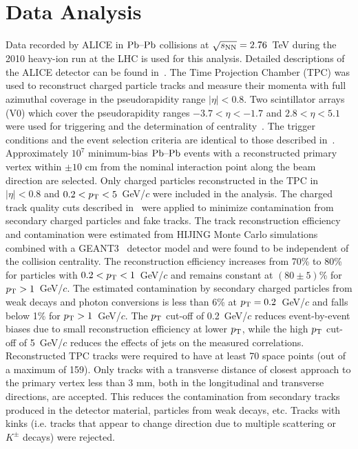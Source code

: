 \section{Data Analysis}
\label{sec:experiment}
Data recorded by ALICE in $\textnormal{Pb--Pb}$ collisions at $\sqrt{s_{\textnormal{NN}}}=2.76$~TeV during the 2010 heavy-ion run at the
LHC is used for this analysis. Detailed descriptions of the ALICE
detector can be found
in~\cite{Aamodt:2008zz,Carminati:2004fp,Alessandro:2006yt}. The Time
Projection Chamber (TPC) was used to reconstruct charged particle
tracks and measure their momenta with full azimuthal coverage in the
pseudorapidity range $|\eta|<0.8$. Two scintillator
arrays (V0) which cover the pseudorapidity  ranges $-3.7<\eta<-1.7$
and $2.8<\eta<5.1$ were used for triggering and the determination of
centrality~\cite{Aamodt:2010cz}. The trigger
conditions and the event selection criteria are identical to those
described in~\cite{Aamodt:2010pa, Aamodt:2010cz}.
Approximately $10^7$ minimum-bias $\textnormal{Pb--Pb}$ events with
a reconstructed primary vertex within $\pm 10$ cm from the nominal
interaction point along the beam direction are selected. Only charged particles reconstructed in the TPC in $|\eta|<0.8$
and $0.2<p_{\rm T}<5$~GeV/$c$ were included in the analysis. The charged track quality cuts
described in~\cite{Aamodt:2010pa} were applied to minimize
contamination from secondary charged particles and fake tracks.
The track reconstruction efficiency and contamination
were estimated from HIJING Monte Carlo
simulations~\cite{Wang:1991hta} combined with a GEANT3~\cite{Brun:1994aa} detector model and were found to be independent of
the collision centrality. The reconstruction efficiency increases from
70\% to 80\% for particles with $0.2<p_{\rm T}<1$~GeV/$c$ and remains
constant at $(80 \pm 5)$\% for $p_{\rm T}>1$~GeV/$c$. The estimated
contamination by secondary charged particles from weak decays and
photon conversions is less than 6\% at $p_{\rm T}=0.2$~GeV/$c$ and falls
below 1\% for $p_{\rm T}>1$~GeV/$c$.
The $p_{\rm T}$ cut-off of 0.2~GeV/$c$ reduces event-by-event biases due to small reconstruction efficiency 
at lower $p_{\rm T}$, while the high $p_{\rm T}$ cut-off of 5~GeV/$c$ reduces the effects of jets on the measured correlations. 
Reconstructed TPC tracks were required to have at least 70 space points (out of a maximum of 159). 
Only tracks with a transverse distance of closest approach to the primary vertex less than 3 mm, both in the longitudinal and transverse directions, are accepted. This reduces the contamination from secondary tracks produced in the detector material, particles from weak decays, etc. Tracks with kinks (i.e. tracks that appear to change direction due to multiple scattering or $K^{\pm}$ decays) were rejected.


